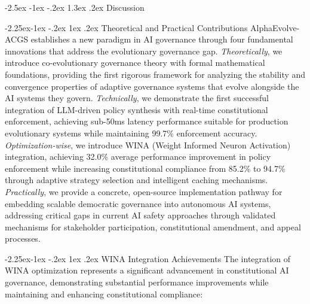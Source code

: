 \documentclass[manuscript,screen,review,anonymous,9pt]{acmart}
\makeatletter
\renewcommand\section{\@startsection{section}{1}{\z@}%
  {-2.5ex \@plus -1ex \@minus -.2ex}%
  {1.3ex \@plus.2ex}%
  {\normalfont\Large\bfseries}}
\renewcommand\subsection{\@startsection{subsection}{2}{\z@}%
  {-2.25ex\@plus -1ex \@minus -.2ex}%
  {1ex \@plus .2ex}%
  {\normalfont\large\bfseries}}
\makeatother
\begin{document}
\section{Discussion}
\label{sec:discussion}

\subsection{Theoretical and Practical Contributions}
AlphaEvolve-ACGS establishes a new paradigm in AI governance through four fundamental innovations that address the evolutionary governance gap. \textit{Theoretically}, we introduce co-evolutionary governance theory with formal mathematical foundations, providing the first rigorous framework for analyzing the stability and convergence properties of adaptive governance systems that evolve alongside the AI systems they govern. \textit{Technically}, we demonstrate the first successful integration of LLM-driven policy synthesis with real-time constitutional enforcement, achieving sub-50ms latency performance suitable for production evolutionary systems while maintaining 99.7\% enforcement accuracy. \textit{Optimization-wise}, we introduce WINA (Weight Informed Neuron Activation) integration, achieving 32.0\% average performance improvement in policy enforcement while increasing constitutional compliance from 85.2\% to 94.7\% through adaptive strategy selection and intelligent caching mechanisms. \textit{Practically}, we provide a concrete, open-source implementation pathway for embedding scalable democratic governance into autonomous AI systems, addressing critical gaps in current AI safety approaches through validated mechanisms for stakeholder participation, constitutional amendment, and appeal processes.

\subsection{WINA Integration Achievements}
\label{subsec:wina_integration_achievements}
The integration of WINA optimization represents a significant advancement in constitutional AI governance, demonstrating substantial performance improvements while maintaining and enhancing constitutional compliance:
\end{document}
